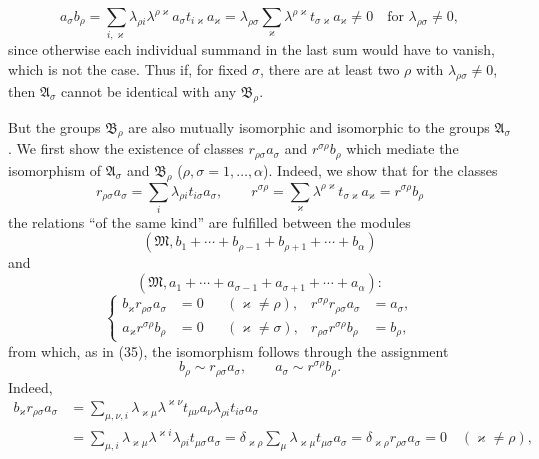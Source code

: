 \documentclass[11pt]{article}
\begin{document}
\[
 a_\sigma b_\rho
 =\sum_{i,\varkappa}\lambda_{\rho i}\lambda^{\rho\varkappa}a_\sigma t_{i\varkappa}a_\varkappa
 =\lambda_{\rho\sigma}
 \sum_\varkappa\lambda^{\rho\varkappa}t_{\sigma\varkappa}a_\varkappa\ne0
 \quad\text{for }\lambda_{\rho\sigma}\ne0,
\]
since otherwise each individual summand in the last sum would have to vanish, which is not the case. Thus if, for fixed $\sigma$, there are at least two $\rho$ with $\lambda_{\rho\sigma}\ne0$, then $\mathfrak A_\sigma$ cannot be identical with any $\mathfrak B_\rho$.

But the groups $\mathfrak B_\rho$ are also mutually isomorphic and isomorphic to the groups $\mathfrak A_\sigma$. We first show the existence of classes $r_{\rho\sigma}a_\sigma$ and $r^{\sigma\rho}b_\rho$ which mediate the isomorphism of $\mathfrak A_\sigma$ and $\mathfrak B_\rho$ ($\rho,
\sigma=1,
\ldots,
\alpha$). Indeed, we show that for the classes
\[
 r_{\rho\sigma}a_\sigma=\sum_i\lambda_{\rho i}t_{i\sigma}a_\sigma,
 \qquad
 r^{\sigma\rho}=\sum_\varkappa\lambda^{\rho\varkappa}t_{\sigma\varkappa}a_\varkappa
 =r^{\sigma\rho}b_\rho
\]
the relations ``of the same kind'' are fulfilled between the modules
\[
 (\mathfrak M,b_1+\cdots+b_{\rho-1}+b_{\rho+1}+\cdots+b_\alpha)
\]
and
\[
 (\mathfrak M,a_1+\cdots+a_{\sigma-1}+a_{\sigma+1}+\cdots+a_\alpha):
\]
\begin{equation}
\left\{
\begin{aligned}
 b_\varkappa r_{\rho\sigma}a_\sigma&=0 &&(\varkappa\ne\rho),&
 r^{\sigma\rho}r_{\rho\sigma}a_\sigma&=a_\sigma,\\
 a_\varkappa r^{\sigma\rho}b_\rho&=0 &&(\varkappa\ne\sigma),&
 r_{\rho\sigma}r^{\sigma\rho}b_\rho&=b_\rho,
\end{aligned}\right.
\tag{39}
\end{equation}
from which, as in (35), the isomorphism follows through the assignment
\begin{equation}
 b_\rho\sim r_{\rho\sigma}a_\sigma,
 \qquad
 a_\sigma\sim r^{\sigma\rho}b_\rho.
\tag{40}
\end{equation}
Indeed,
\[
\begin{aligned}
 b_\varkappa r_{\rho\sigma}a_\sigma
 &=\sum_{\mu,\nu,i}\lambda_{\varkappa\mu}\lambda^{\varkappa\nu}t_{\mu\nu}a_\nu\lambda_{\rho i}t_{i\sigma}a_\sigma\\
 &=\sum_{\mu,i}\lambda_{\varkappa\mu}\lambda^{\varkappa i}\lambda_{\rho i}t_{\mu\sigma}a_\sigma
 =\delta_{\varkappa\rho}\sum_\mu\lambda_{\varkappa\mu}t_{\mu\sigma}a_\sigma
 =\delta_{\varkappa\rho}r_{\rho\sigma}a_\sigma=0\quad(\varkappa\ne\rho),
\end{aligned}
\]
\end{document}
